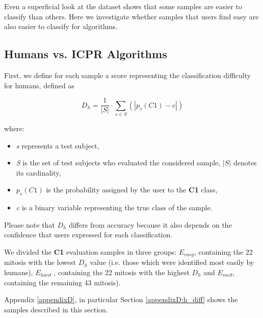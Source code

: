Even a superficial look at the dataset shows that some samples are easier to classify than others.
Here we investigate whether samples that users find easy are also easier to classify for algorithms.

\vspace{0.5cm}

\subsection{Humans vs. ICPR Algorithms}

First, we define for each sample a score representing the classification difficulty for humans, defined as

\begin{equation}
 D_h = \frac{1}{|S|} \cdot \sum_{s \in S} \left(  |p_s(C1) - c |  \right)
 \label{ch6:eq2}
\end{equation}

\noindent where:

\begin{itemize}
 \item \textit{s} represents a test subject,
 \item \textit{S} is the set of test subjects who evaluated the considered sample, $|S|$ denotes its cardinality,
 \item $p_s(C1)$ is the probability assigned by the user to the \textbf{C1} class,
 \item \textit{c} is a binary variable representing the true class of the sample.
\end{itemize}

Please note that $D_h$ differs from accuracy because it also depends on the confidence that users expressed for each classification.

We divided the \textbf{C1} evaluation samples in three groups: $E_{easy}$, containing the 22 mitosis with the lowest $D_h$ value 
(i.e. those which were identified most easily by humans), $E_{hard}$ , containing the 22 mitosis with the highest $D_h$  and $E_{med}$,
containing the remaining 43 mitosis).

Appendix \ref{appendixD}, in particular Section \ref{appendixD:h_diff} shows the samples described in this section.

